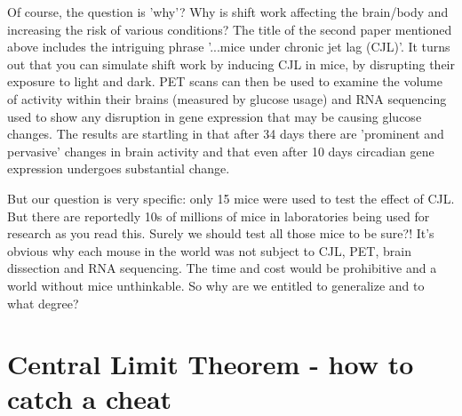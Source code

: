 \documentclass[a4paper,twosided,notoc]{tufte-book}
\begin{document}
Of course, the question is 'why'? Why is shift work affecting the brain/body and increasing the risk of various conditions? The title of the second paper mentioned above includes the intriguing phrase '...mice under chronic jet lag (CJL)'. It turns out that you can simulate shift work by inducing CJL in mice, by disrupting their exposure to light and dark. PET scans can then be used to examine the volume of activity within their brains (measured by glucose usage) and RNA sequencing used to show any disruption in gene expression that may be causing glucose changes. The results are startling in that after 34 days there are 'prominent and pervasive' changes in brain activity and that even after 10 days circadian gene expression  undergoes substantial change. 

But our question is very specific: only 15 mice were used to test the effect of CJL. But there are reportedly 10s of millions  of mice in laboratories being used for research as you read this. Surely we should test all those mice to be sure?! It's obvious why each mouse in the world was not subject to CJL, PET, brain dissection and RNA sequencing. The time and cost would be prohibitive and a world without mice unthinkable. So why are we entitled to generalize and to what degree?


\chapter{Central Limit Theorem - how to catch a cheat}
\end{document}
